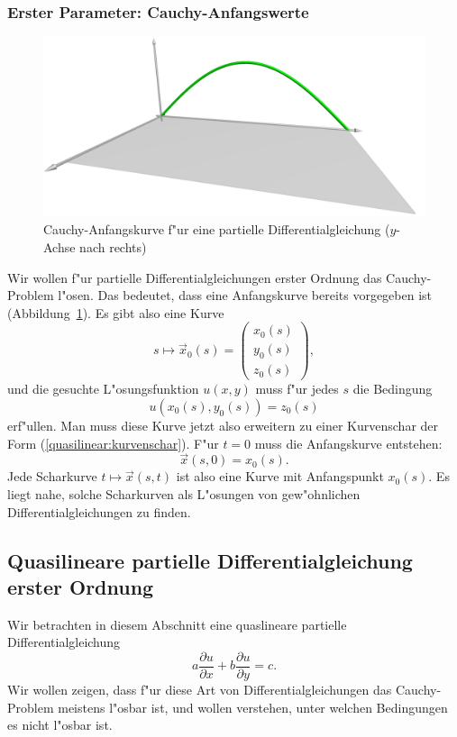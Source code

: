 \subsubsection{Erster Parameter: Cauchy-Anfangswerte}
\begin{figure}
\begin{center}
\includegraphics[width=\hsize]{3d/cauchy.jpg}
\end{center}
\caption{Cauchy-Anfangskurve f"ur eine partielle Differentialgleichung
($y$-Achse nach rechts)
\label{geometrie:cauchy-anfangskurve}}
\end{figure}
Wir wollen f"ur partielle Differentialgleichungen erster Ordnung
das Cauchy-Problem l"osen.
Das bedeutet, dass eine Anfangskurve bereits vorgegeben ist
(Abbildung~\ref{geometrie:cauchy-anfangskurve}).
Es gibt also eine Kurve
\begin{equation}
s\mapsto\vec x_0(s)=\begin{pmatrix}
x_0(s)\\
y_0(s)\\
z_0(s)
\end{pmatrix},
\label{quasilinear:anfangskurve}
\end{equation}
und die gesuchte L"osungsfunktion $u(x,y)$ muss f"ur jedes $s$ die
Bedingung
\[
u(x_0(s), y_0(s))=z_0(s)
\]
erf"ullen.
Man muss diese Kurve jetzt also erweitern zu einer Kurvenschar
der Form (\ref{quasilinear:kurvenschar}).
F"ur $t=0$ muss die Anfangskurve entstehen:
\[
\vec x(s,0)=x_0(s).
\]
Jede Scharkurve $t\mapsto \vec x(s,t)$ ist also eine Kurve
mit Anfangspunkt $x_0(s)$.
Es liegt nahe, solche Scharkurven als L"osungen von gew"ohnlichen
Differentialgleichungen zu finden.

\subsection{Quasilineare partielle Differentialgleichung erster Ordnung}
Wir betrachten in diesem Abschnitt eine quaslineare partielle 
Differentialgleichung
\begin{equation}
a\frac{\partial u}{\partial x}
+
b\frac{\partial u}{\partial y}
=
c.
\label{quasilinear:equation}
\end{equation}
Wir wollen zeigen, dass f"ur diese Art von Differentialgleichungen
das Cauchy-Problem meistens l"osbar ist, und wollen verstehen,
unter welchen Bedingungen es nicht l"osbar ist.

